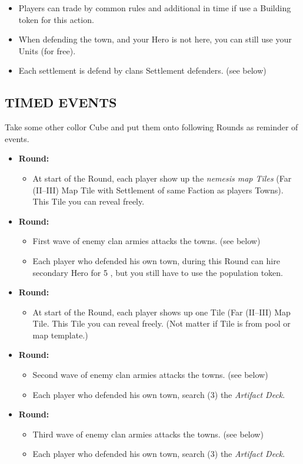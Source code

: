 \begin{multicols*}{2}
\begin{itemize}
  \item Players can trade by common rules and additional in time if use a Building token for this action.
  \item When defending the town, and your Hero is not here, you can still use your Units (for free).
  \item Each settlement is defend by clans Settlement defenders. (see below)
\end{itemize}

\subsection*{\MakeUppercase{Timed Events}}

  Take some other collor Cube and put them onto following Rounds as reminder of events.

  \begin{itemize}
   \item \textbf{ Round:}
    \begin{itemize}
      \item At start of the Round, each player show up the \textit{nemesis map Tiles} (Far (II--III) Map Tile with Settlement of same Faction as players Towns). This Tile you can reveal freely.
    \end{itemize}
   \item \textbf{ Round:}
    \begin{itemize}
      \item  First wave of enemy clan armies attacks the towns. (see below)
      \item  Each player who defended his own town, during this Round can hire secondary Hero for 5 , but you still have to use the population token.
    \end{itemize}
   \item \textbf{ Round:}
    \begin{itemize}
      \item At start of the Round, each player shows up one Tile (Far (II--III) Map Tile. This Tile you can reveal freely. (Not matter if Tile is from pool or map template.)
    \end{itemize}
   \item \textbf{ Round:}
    \begin{itemize}
      \item Second wave of enemy clan armies attacks the towns. (see below)
      \item Each player who defended his own town, search (3) the \textit{Artifact Deck}.
     \end{itemize}
   \item \textbf{ Round:}
    \begin{itemize}
      \item Third wave of enemy clan armies attacks the towns. (see below)
      \item Each player who defended his own town, search (3) the \textit{Artifact Deck}.
    \end{itemize}
  \end{itemize}


\end{multicols*}
